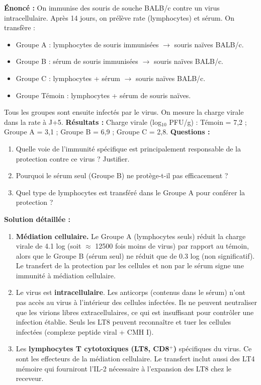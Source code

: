 \documentclass[11pt]{article}
\begin{document}
\begin{exoresolu}
\textbf{Énoncé :} On immunise des souris de souche BALB/c contre un virus intracellulaire. Après 14 jours, on prélève rate (lymphocytes) et sérum. On transfère :
\begin{itemize}
    \item Groupe A : lymphocytes de souris immunisées $\to$ souris naïves BALB/c.
    \item Groupe B : sérum de souris immunisées $\to$ souris naïves BALB/c.
    \item Groupe C : lymphocytes + sérum $\to$ souris naïves BALB/c.
    \item Groupe Témoin : lymphocytes + sérum de souris naïves.
\end{itemize}
Tous les groupes sont ensuite infectés par le virus. On mesure la charge virale dans la rate à J+5.
\textbf{Résultats :} Charge virale (log$_{10}$ PFU/g) : Témoin = 7,2 ; Groupe A = 3,1 ; Groupe B = 6,9 ; Groupe C = 2,8.
\textbf{Questions :}
\begin{enumerate}
    \item Quelle voie de l'immunité spécifique est principalement responsable de la protection contre ce virus ? Justifier.
    \item Pourquoi le sérum seul (Groupe B) ne protège-t-il pas efficacement ?
    \item Quel type de lymphocytes est transféré dans le Groupe A pour conférer la protection ?
\end{enumerate}

\tcblower

\textbf{Solution détaillée :}
\begin{enumerate}
    \item \textbf{Médiation cellulaire.} Le Groupe A (lymphocytes seuls) réduit la charge virale de \num{4,1} log (soit $\approx$ \num{12500} fois moins de virus) par rapport au témoin, alors que le Groupe B (sérum seul) ne réduit que de \num{0,3} log (non significatif). Le transfert de la protection par les cellules et non par le sérum signe une immunité à médiation cellulaire.
    \item Le virus est \textbf{intracellulaire}. Les anticorps (contenus dans le sérum) n'ont pas accès au virus à l'intérieur des cellules infectées. Ils ne peuvent neutraliser que les virions libres extracellulaires, ce qui est insuffisant pour contrôler une infection établie. Seuls les LT8 peuvent reconnaître et tuer les cellules infectées (complexe peptide viral + CMH I).
    \item Les \textbf{lymphocytes T cytotoxiques (LT8, CD8$^+$)} spécifiques du virus. Ce sont les effecteurs de la médiation cellulaire. Le transfert inclut aussi des LT4 mémoire qui fourniront l'IL-2 nécessaire à l'expansion des LT8 chez le receveur.
\end{enumerate}
\end{exoresolu}
\end{document}
